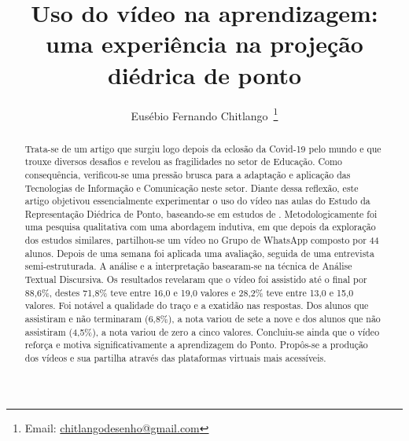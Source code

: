 \documentclass[portuguese]{textolivre}
\title{Uso do vídeo na aprendizagem: uma experiência na projeção diédrica de ponto}
\author[1]{Eusébio Fernando Chitlango~\orcid{0009-0000-9574-0797}\thanks{Email: \href{mailto:chitlangodesenho@gmail.com}{chitlangodesenho@gmail.com}}}
\affil[1]{Universidade Federal de Minas Gerais, Escola de Arquitetura e Design, Belo Horizonte, MG, Brasil.}
\begin{document}
\maketitle

\begin{polyabstract}
\begin{abstract}
Trata-se de um artigo que surgiu logo depois da eclosão da Covid-19 pelo mundo e que trouxe diversos desafios e revelou as fragilidades no setor de Educação. Como consequência, verificou-se uma pressão brusca para a adaptação e aplicação das Tecnologias de Informação e Comunicação neste setor. Diante dessa reflexão, este artigo objetivou essencialmente experimentar o uso do vídeo nas aulas do Estudo da Representação Diédrica de Ponto, baseando-se em estudos de \textcite{silveira2020,deckert2010}. Metodologicamente foi uma pesquisa qualitativa com uma abordagem indutiva, em que depois da exploração dos estudos similares, partilhou-se um vídeo no Grupo de WhatsApp composto por 44 alunos. Depois de uma semana foi aplicada uma avaliação, seguida de uma entrevista semi-estruturada. A análise e a interpretação basearam-se na técnica de Análise Textual Discursiva. Os resultados revelaram que o vídeo foi assistido até o final por 88,6\%, destes 71,8\% teve entre 16,0 e 19,0 valores e 28,2\% teve entre 13,0 e 15,0 valores. Foi notável a qualidade do traço e a exatidão nas respostas. Dos alunos que assistiram e não terminaram (6,8\%), a nota variou de sete a nove e dos alunos que não assistiram (4,5\%), a nota variou de zero a cinco valores. Concluiu-se ainda que o vídeo reforça e motiva significativamente a aprendizagem do Ponto. Propôs-se a produção dos vídeos e sua partilha através das plataformas virtuais mais acessíveis.

\end{abstract}


\end{polyabstract}
\end{document}
